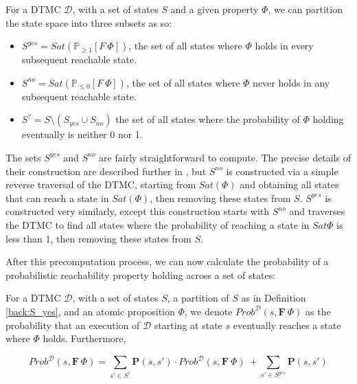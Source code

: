 \begin{definition}
\label{back:S_yes}

    For a DTMC $\mathcal{D}$, with a set of states $S$ and a given property $\Phi$, we can partition the state space into three subsets as so:

    \begin{itemize}
        
        \item $S^{yes} = Sat(\mathbb{P}_{\geq 1}[F \: \Phi])$, the set of all states where $\Phi$ holds in every subsequent reachable state.
        \item $S^{no} = Sat(\mathbb{P}_{\leq 0}[F \: \Phi])$, the set of all states where $\Phi$ never holds in any subsequent reachable state.
        \item $S^{?} = S \setminus (S_{yes} \cup S_{no})$ the set of all states where the probability of $\Phi$ holding eventually is neither 0 nor 1.

    \end{itemize}

\end{definition}

The sets $S^{yes}$ and $S^{no}$ are fairly straightforward to compute. The precise details of their construction are described further in \cite{kwiatkowska_stochastic_2007}, but $S^{no}$ is constructed via a simple reverse traversal of the DTMC, starting from $Sat(\Phi)$ and obtaining all states that can reach a state in $Sat(\Phi)$, then removing these states from $S$. $S^{yes}$ is constructed very similarly, except this construction starts with $S^{no}$ and traverses the DTMC to find all states where the probability of reaching a state in $Sat{\Phi}$ is less than 1, then removing these states from $S$.

After this precomputation process, we can now calculate the probability of a probabilistic reachability property holding across a set of states:

\begin{definition}
\label{back:F_operator}

    For a DTMC $\mathcal{D}$, with a set of states $S$, a partition of $S$ as in Definition \ref{back:S_yes}, and an atomic proposition $\Phi$, we denote $Prob^{\mathcal{D}}(s, \mathbf{F} \: \Phi)$ as the probability that an execution of $\mathcal{D}$ starting at state $s$ eventually reaches a state where $\Phi$ holds. Furthermore,

    \begin{equation*}
        Prob^{\mathcal{D}}(s, \mathbf{F} \: \Phi) = \sum_{s' \in S^{?}} \mathbf{P}(s, s') \cdot Prob^{\mathcal{D}}(s, \mathbf{F} \: \Phi) \: + \sum_{s' \in S^{yes}} \mathbf{P}(s, s')
    \end{equation*}
    
\end{definition}


